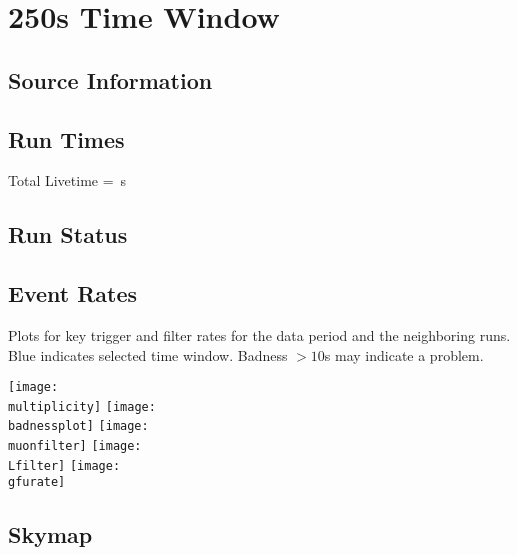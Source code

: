 \documentclass[titlepage]{article}
\begin{document}
\pagebreak
\section{250s Time Window}

\subsection{Source Information}
\sourcetable

\subsection{Run Times}
\runtimetable

Total Livetime = \livetime\,s

\subsection{Run Status}
\runstatustable

\pagebreak
\subsection{Event Rates}
Plots for key trigger and filter rates for the data period
and the neighboring runs.  Blue indicates selected time window.
Badness $>10$s may indicate a problem.

\vspace{1em}
{
 \centering
 \texttt{[image: \\multiplicity]}
 \texttt{[image: \\badnessplot]}
 \texttt{[image: \\muonfilter]}
 \texttt{[image: \\Lfilter]}
 \texttt{[image: \\gfurate]}
}


%
%
%
%
%
%
%

\pagebreak
\subsection{Skymap}
\end{document}
